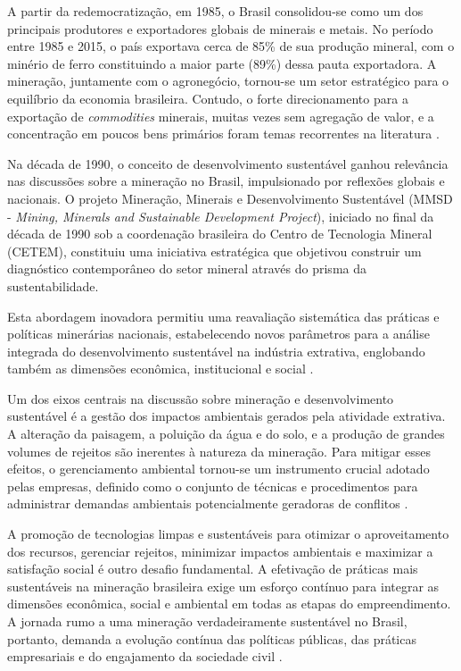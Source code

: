 A partir da redemocratização, em 1985, o Brasil consolidou-se como um dos principais produtores e exportadores globais de minerais e metais. No período entre 1985 e 2015, o país exportava cerca de 85\% de sua produção mineral, com o minério de ferro constituindo a maior parte (89\%) dessa pauta exportadora. A mineração, juntamente com o agronegócio, tornou-se um setor estratégico para o equilíbrio da economia brasileira. Contudo, o forte direcionamento para a exportação de \emph{commodities} minerais, muitas vezes sem agregação de valor, e a concentração em poucos bens primários foram temas recorrentes na literatura \cite{fernandes2016}.

Na década de 1990, o conceito de desenvolvimento sustentável ganhou relevância nas discussões sobre a mineração no Brasil, impulsionado por reflexões globais e nacionais. O projeto Mineração, Minerais e Desenvolvimento Sustentável (MMSD - \emph{Mining, Minerals and Sustainable Development Project}), iniciado no final da década de 1990 sob a coordenação brasileira do Centro de Tecnologia Mineral (CETEM), constituiu uma iniciativa estratégica que objetivou construir um diagnóstico contemporâneo do setor mineral através do prisma da sustentabilidade. 

Esta abordagem inovadora permitiu uma reavaliação sistemática das práticas e políticas minerárias nacionais, estabelecendo novos parâmetros para a análise integrada do desenvolvimento sustentável na indústria extrativa, englobando também as dimensões econômica, institucional e social \cite{barreto2001}.

Um dos eixos centrais na discussão sobre mineração e desenvolvimento sustentável é a gestão dos impactos ambientais gerados pela atividade extrativa. A alteração da paisagem, a poluição da água e do solo, e a produção de grandes volumes de rejeitos são inerentes à natureza da mineração. Para mitigar esses efeitos, o gerenciamento ambiental tornou-se um instrumento crucial adotado pelas empresas, definido como o conjunto de técnicas e procedimentos para administrar demandas ambientais potencialmente geradoras de conflitos \cite{barreto2001}.

A promoção de tecnologias limpas e sustentáveis para otimizar o aproveitamento dos recursos, gerenciar rejeitos, minimizar impactos ambientais e maximizar a satisfação social é outro desafio fundamental. A efetivação de práticas mais sustentáveis na mineração brasileira exige um esforço contínuo para integrar as dimensões econômica, social e ambiental em todas as etapas do empreendimento. A jornada rumo a uma mineração verdadeiramente sustentável no Brasil, portanto, demanda a evolução contínua das políticas públicas, das práticas empresariais e do engajamento da sociedade civil \cite{barreto2001}.

